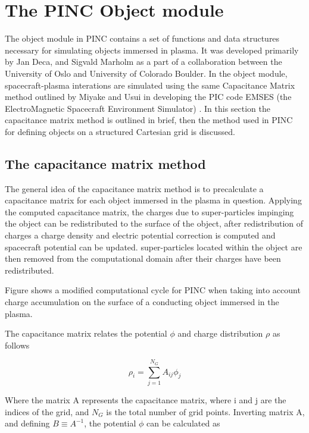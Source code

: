 \section{The PINC Object module}
The object module in PINC contains a set of functions and data structures necessary for simulating objects immersed in plasma. It was developed primarily by Jan Deca, and Sigvald Marholm as a part of a collaboration between the University of Oslo and University of Colorado Boulder. In the object module, spacecraft-plasma interations are simulated using the same Capacitance Matrix method outlined by Miyake and Usui in developing the PIC code EMSES (the ElectroMagnetic Spacecraft Environment Simulator) . In this section the capacitance matrix method is outlined in brief, then the method used in PINC for defining objects on a structured Cartesian grid is discussed. 

\subsection{The capacitance matrix method}
The general idea of the capacitance matrix method is to precalculate a capacitance matrix for each object immersed in the plasma in question. Applying the computed capacitance matrix, the charges due to super-particles impinging the object can be redistributed to the surface of the object, after redistribution of charges a charge density and electric potential correction is computed and spacecraft potential can be updated. super-particles located within the object are then removed from the computational domain after their charges have been redistributed. 


Figure  shows a modified computational cycle for PINC when taking into account charge accumulation on the surface of a conducting object immersed in the plasma.

The capacitance matrix relates the potential $\phi$ and charge distribution $\rho$ as follows 

\begin{equation}
    \rho_i = \sum^{N_G}_{j=1} A_{ij} \phi_j
\end{equation}

Where the matrix A represents the capacitance matrix, where i and j are the indices of the grid, and $N_G$ is the total number of grid points. Inverting matrix A, and defining $B \equiv A^{-1}$, the potential $\phi$ can be calculated as 

